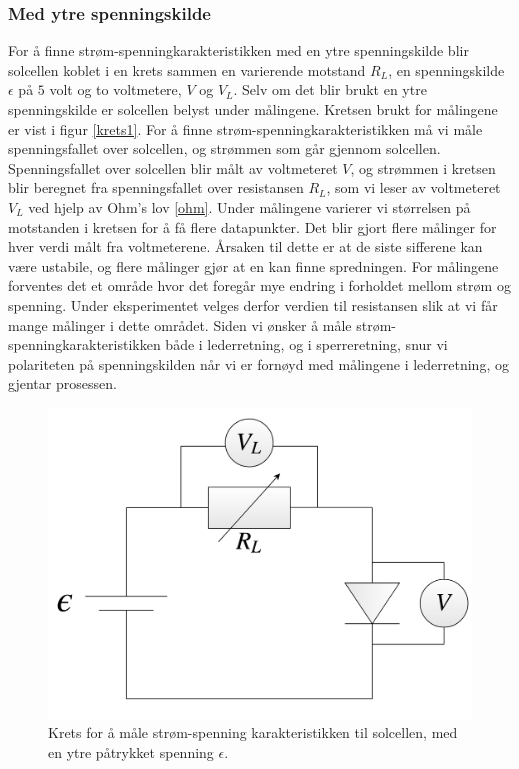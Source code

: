 \documentclass[%
 reprint,
 amsmath,amssymb,
 aps,
 norsk,
 booktabs
]{revtex4-1}
\begin{document}
\subsubsection{Med ytre spenningskilde}
For å finne strøm-spenningkarakteristikken med en ytre spenningskilde blir solcellen koblet i en krets sammen en varierende motstand $R_L$, en spenningskilde $\epsilon$ på $5$ volt og to voltmetere, $V$ og $V_L$. Selv om det blir brukt en ytre spenningskilde er solcellen belyst under målingene. Kretsen brukt for målingene er vist i figur \vref{krets1}. For å finne strøm-spenningkarakteristikken må vi måle spenningsfallet over solcellen, og strømmen som går gjennom solcellen. Spenningsfallet over solcellen blir målt av voltmeteret $V$, og strømmen i kretsen blir beregnet fra spenningsfallet over resistansen $R_L$, som vi leser av voltmeteret $V_L$ ved hjelp av Ohm's lov \eqref{ohm}. Under målingene varierer vi størrelsen på motstanden i kretsen for å få flere datapunkter. Det blir gjort flere målinger for hver verdi målt fra voltmeterene. Årsaken til dette er at de siste sifferene kan være ustabile, og flere målinger gjør at en kan finne spredningen. For målingene forventes det et område hvor det foregår mye endring i forholdet mellom strøm og spenning. Under eksperimentet velges derfor verdien til resistansen slik at vi får mange målinger i dette området. Siden vi ønsker å måle strøm-spenningkarakteristikken både i lederretning, og i sperreretning, snur vi polariteten på spenningskilden når vi er fornøyd med målingene i lederretning, og gjentar prosessen.
\begin{figure}[h!]
  \centering
  \includegraphics[scale=0.15]{krets1.png}
  \caption{Krets for å måle strøm-spenning karakteristikken til solcellen, med en ytre påtrykket spenning $\epsilon$.}
  \label{krets1}
\end{figure}
\end{document}
